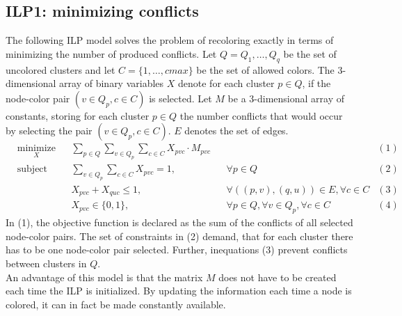 \subsection{ILP1: minimizing conflicts}
\label{sec:ilp1}
The following ILP model solves the problem of recoloring exactly in terms of minimizing the number of produced conflicts. Let $Q = {Q_1,\ldots,Q_q}$ be the set of uncolored clusters and let $C=\{1,\ldots,cmax\}$ be the set of allowed colors. The 3-dimensional array of binary variables $X$ denote for each cluster $p \in Q$, if the node-color pair $(v \in Q_p, c \in C)$ is selected. Let $M$ be a 3-dimensional array of constants, storing for each cluster $p \in Q$ the number conflicts that would occur by selecting the pair $(v \in Q_p, c \in C)$. $E$ denotes the set of edges.
\begin{equation*}
\begin{aligned}
& \underset{X}{\text{minimize}} && \sum_{p \in Q}\sum_{v \in Q_p}\sum_{c \in C} X_{pvc} \cdot M_{pvc}                    &&&(1)\\
& \text{subject to} && \sum_{v \in Q_p}\sum_{c \in C} X_{pvc}=1, && \forall p \in Q    &(2)\\
&&& X_{pvc}+X_{quc} \leq 1, && \forall ((p,v),(q,u)) \in E, \forall c \in C     &(3)\\
&&& X_{pvc} \in \{0,1\}, && \forall p \in Q, \forall v \in Q_p, \forall c \in C         &(4)
\end{aligned}
\end{equation*}
In (1), the objective function is declared as the sum of the conflicts of all selected node-color pairs. The set of constraints in (2) demand, that for each cluster there has to be one node-color pair selected. Further, inequations (3) prevent conflicts between clusters in $Q$.\\
An advantage of this model is that the matrix $M$ does not have to be created each time the ILP is initialized. By updating the information each time a node is colored, it can in fact be made constantly available.


